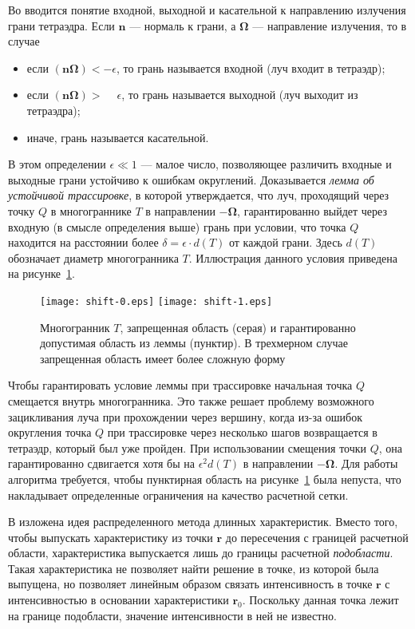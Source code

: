 Во  вводится понятие входной, выходной и касательной к направлению излучения грани тетраэдра. Если $\mathbf n$ --- нормаль к грани, а $\boldsymbol \Omega$ --- направление излучения, то в случае
\begin{itemize}
\item если $(\mathbf n \boldsymbol \Omega) < -\epsilon$, то грань называется входной (луч входит в тетраэдр);
\item если $(\mathbf n \boldsymbol \Omega) > \phantom{-}\epsilon$, то грань называется выходной (луч выходит из тетраэдра);
\item иначе, грань называется касательной.
\end{itemize}
В этом определении $\epsilon \ll 1$ --- малое число, позволяющее различить входные и выходные грани устойчиво к ошибкам округлений. Доказывается 
\emph{лемма об устойчивой трассировке}, в которой утверждается, что луч, проходящий через точку $Q$ в многограннике $T$ в направлении $-\boldsymbol \Omega$, гарантированно выйдет через входную (в смысле определения выше) грань при условии, что точка $Q$ находится на расстоянии более $\delta = \epsilon \cdot d(T)$ от каждой грани. Здесь $d(T)$ обозначает диаметр многогранника $T$. Иллюстрация данного условия приведена на рисунке~\ref{fig:shift}.
\begin{figure}[ht!]
\centering
\texttt{[image: shift-0.eps]}
\texttt{[image: shift-1.eps]}
\caption{Многогранник $T$, запрещенная область (серая) и гарантированно допустимая область из леммы (пунктир). В трехмерном случае запрещенная область имеет более сложную форму}
\label{fig:shift}
\end{figure}

Чтобы гарантировать условие леммы при трассировке начальная точка $Q$ смещается внутрь многогранника. Это также решает проблему возможного зацикливания луча при прохождении через вершину, когда из-за ошибок округления точка $Q$ при трассировке через несколько шагов возвращается в тетраэдр, который был уже пройден. При использовании смещения точки $Q$, она гарантированно сдвигается хотя бы на $\epsilon^2 d(T)$ в направлении $-\boldsymbol \Omega$. Для работы алгоритма требуется, чтобы пунктирная область на рисунке~\ref{fig:shift} была непуста, что накладывает определенные ограничения на качество расчетной сетки.

В  изложена идея распределенного метода длинных характеристик. Вместо того, чтобы выпускать характеристику из точки $\mathbf r$ до пересечения с границей расчетной области, характеристика выпускается лишь до границы расчетной \emph{подобласти}. Такая характеристика не позволяет найти решение в точке, из которой была выпущена, но позволяет линейным образом связать интенсивность в точке $\mathbf r$ с интенсивностью в основании характеристики $\mathbf r_0$. Поскольку данная точка лежит на границе подобласти, значение интенсивности в ней не известно.

